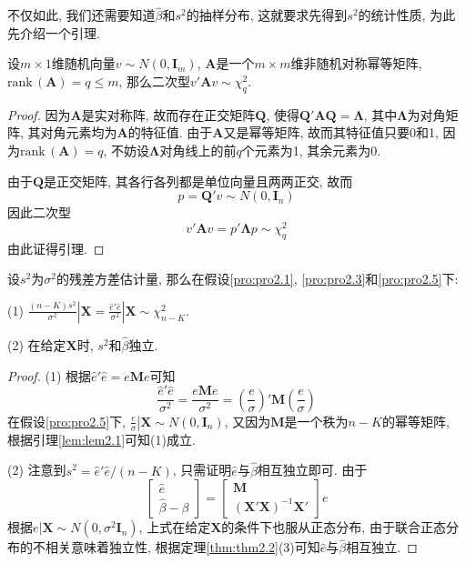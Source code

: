 \documentclass[cn, 12pt, math=mtpro2, bibstyle=apa, blue, twocol]{elegantbook}
\newcommand{\X}{\mathbold{X}}
\newcommand{\hb}{\hat{\beta}}
\newcommand{\M}{\mathbold{M}}
\begin{document}
不仅如此, 我们还需要知道$\hat{\beta}$和$s^2$的抽样分布, 这就要求先得到$s^2$的统计性质, 为此先介绍一个引理.
\begin{lemma}\label{lem:lem2.1}
设$m\times1$维随机向量$v\sim N(0,\mathbold{I}_m)$, $\mathbold{A}$是一个$m\times m$维非随机对称幂等矩阵, $\text{rank}\,(\mathbold{A})=q\leq m$, 那么二次型$v'\mathbold{A}v\sim \chi^2_q$.
\end{lemma}
\begin{proof}
  因为$\mathbold{A}$是实对称阵, 故而存在正交矩阵$\mathbold{Q}$, 使得$\mathbold{Q}'\mathbold{AQ}=\mathbold{\Lambda}$, 其中$\mathbold{\Lambda}$为对角矩阵, 其对角元素均为$\mathbold{A}$的特征值. 由于$\mathbold{A}$又是幂等矩阵, 故而其特征值只要0和1, 因为$\text{rank}\,(\mathbold{A})=q$, 不妨设$\mathbold{\Lambda}$对角线上的前$q$个元素为1, 其余元素为0.

  由于$\mathbold{Q}$是正交矩阵, 其各行各列都是单位向量且两两正交, 故而
  $$p=\mathbold{Q}'v\sim N(0,\mathbold{I}_n)$$
  因此二次型
  $$v'\mathbold{A}v=p'\mathbold{\Lambda}p\sim\chi^2_q$$
  由此证得引理.
\end{proof}
\begin{theorem}\label{thm:thm2.5}
  设$s^2$为$\sigma^2$的残差方差估计量, 那么在假设\ref{pro:pro2.1}, \ref{pro:pro2.3}和\ref{pro:pro2.5}下:

  (1) $\displaystyle \left.\frac{(n-K)s^2}{\sigma^2}\right|\X=\left.\frac{\hat{e}'\hat{e}}{\sigma^2}\right|\X\sim\chi_{n-K}^2$.

  (2) 在给定$\X$时, $s^2$和$\hb$独立.
\end{theorem}
\begin{proof}
  (1) 根据$\hat{e}'\hat{e}=e\M e$可知
  $$\frac{\hat{e}'\hat{e}}{\sigma^2}=\frac{e\M e}{\sigma^2}=\left(\frac{e}{\sigma}\right)'\M\left(\frac{e}{\sigma}\right)$$
  在假设\ref{pro:pro2.5}下, $\displaystyle \left.\frac{e}{\sigma}\right|\X\sim N(0,\mathbold{I}_n)$, 又因为$\M$是一个秩为$n-K$的幂等矩阵, 根据引理\ref{lem:lem2.1}可知(1)成立.

  (2) 注意到$s^2=\hat{e}'\hat{e}/(n-K)$, 只需证明$\hat{e}$与$\hb$相互独立即可. 由于
  \begin{equation}\label{eq2.5}
  \begin{bmatrix}
      \hat{e} \\
      \hb-\beta
    \end{bmatrix}=\begin{bmatrix}
                    \M \\
                    (\X'\X)^{-1}\X'
                  \end{bmatrix}e
  \end{equation}
  根据$e|\X\sim N(0,\sigma^2\mathbold{I}_n)$, 上式在给定$\X$的条件下也服从正态分布, 由于联合正态分布的不相关意味着独立性, 根据定理\ref{thm:thm2.2}(3)可知$\hat{e}$与$\hat{\beta}$相互独立.
\end{proof}
\end{document}
